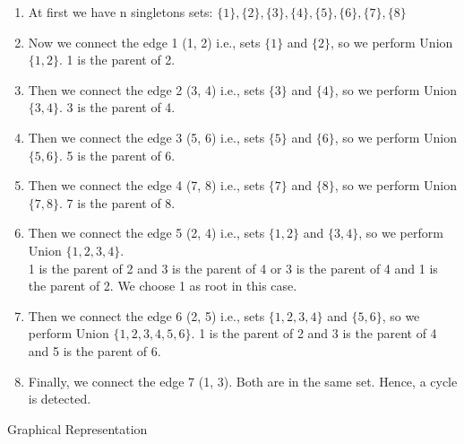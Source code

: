 \documentclass{article}
\begin{document}
\begin{enumerate}
    \item At first we have n singletons sets: $\{1\}, \{2\}, \{3\}, \{4\}, \{5\}, \{6\}, \{7\}, \{8\}$
    \item Now we connect the edge 1 (1, 2) i.e., sets $\{1\}$ and $\{2\}$, so we perform Union $\{1, 2\}$. 1 is the parent of 2.
    \item Then we connect the edge 2 (3, 4) i.e., sets $\{3\}$ and $\{4\}$, so we perform Union $\{3, 4\}$. 3 is the parent of 4.
    \item Then we connect the edge 3 (5, 6) i.e., sets $\{5\}$ and $\{6\}$, so we perform Union $\{5, 6\}$. 5 is the parent of 6.
    \item Then we connect the edge 4 (7, 8) i.e., sets $\{7\}$ and $\{8\}$, so we perform Union $\{7, 8\}$. 7 is the parent of 8.
    \item Then we connect the edge 5 (2, 4) i.e., sets $\{1, 2\}$ and $\{3, 4\}$, so we perform Union $\{1, 2, 3, 4\}$.\\ 1 is the parent of 2 and 3 is the parent of 4 or 3 is the parent of 4 and 1 is the parent of 2. We choose 1 as root in this case.
    \item Then we connect the edge 6 (2, 5) i.e., sets $\{1, 2, 3, 4\}$ and $\{5, 6\}$, so we perform Union $\{1, 2, 3, 4, 5, 6\}$. 1 is the parent of 2 and 3 is the parent of 4 and 5 is the parent of 6. 
    \item Finally, we connect the edge 7 (1, 3). Both are in the same set. Hence, a cycle is detected. 
\end{enumerate}



\begin{center} \label{fig2}
 {Graphical Representation}
\end{center}
\end{document}
